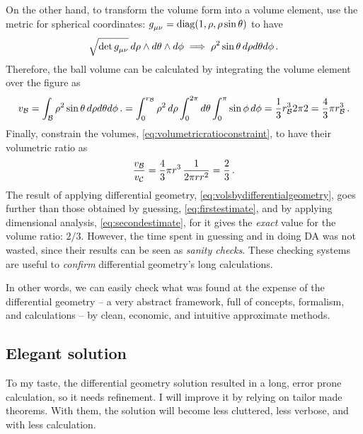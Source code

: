On the other hand, to transform the volume form into a volume element, use the metric for spherical coordinates: $\tmetric\mu\nu = \diag\vat{1,\sxpos,\sxpos\sin\sypos}$ to have
%
\begin{equation*}
  \sqrt{\det\tmetric\mu\nu}\,d\sxpos\oprod d\sypos\oprod d\szpos \implies
    \sxpos^2\sin\sypos\,d\sxpos d\sypos d\szpos\,.
\end{equation*}
%
Therefore, the ball volume can be calculated by integrating the volume element over the figure as
%
\begin{equation*}
  v_{\mathcal{B}} = \int_{\mathcal{B}}\rho^2\sin\theta\,d\rho d\theta d\phi\,.
                = \int_{0}^{r_{\mathcal{B}}}\rho^2\,d\rho \int_{0}^{2\pi} d\theta \int_{0}^{\pi}\sin\phi\,d\phi 
                = \dfrac 13r_{\mathcal{B}}^3 2\pi 2
                = \dfrac 43\pi r_{\mathcal{B}}^3\,.
\end{equation*}
%
Finally, constrain the volumes, \cref{eq:volumetricratioconstraint}, to have their volumetric ratio as
%
\begin{equation}\label{eq:volsbydifferentialgeometry}
  \dfrac{v_{\mathcal{B}}}{v_{\mathcal{C}}} = \dfrac 43\pi r^3\,\dfrac{1}{2\pi rr^2}
                                      = \dfrac 23\,.
\end{equation}
%
 The result of applying differential geometry, \cref{eq:volsbydifferentialgeometry}, goes further than those obtained by guessing, \cref{eq:firstestimate}, and by applying dimensional analysis, \cref{eq:secondestimate}, for it gives the \emph{exact} value for the volume ratio: $2/3$. However, the time spent in guessing and in doing DA was not wasted, since their results can be seen as \emph{sanity checks}. These checking systems are useful to \emph{confirm} differential geometry's long calculations.

 In other words, we can easily check what was found at the expense of the differential geometry -- a very abstract framework, full of concepts, formalism, and calculations -- by clean, economic, and intuitive approximate methods.



\subsection{Elegant solution} %
\label{sub:elegant_solution}

 To my taste, the differential geometry solution resulted in a long, error prone calculation, so it needs refinement. I will improve it by relying on tailor made theorems. With them, the solution will become less cluttered, less verbose, and with less calculation.

